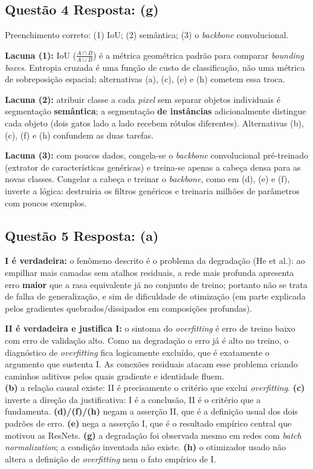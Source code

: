 \documentclass[11pt,a4paper]{article}
\begin{document}
\subsection*{Questão 4 \textemdash{} Resposta: (g)}
Preenchimento correto: (1) IoU; (2) semântica; (3) o \textit{backbone} convolucional.

\textbf{Lacuna (1):} IoU ($\frac{A \cap B}{A \cup B}$) é a métrica geométrica padrão para comparar \textit{bounding boxes}. Entropia cruzada é uma função de custo de classificação, não uma métrica de sobreposição espacial; alternativas (a), (c), (e) e (h) cometem essa troca.

\textbf{Lacuna (2):} atribuir classe a cada \textit{pixel} sem separar objetos individuais é segmentação \textbf{semântica}; a segmentação \textbf{de instâncias} adicionalmente distingue cada objeto (dois gatos lado a lado recebem rótulos diferentes). Alternativas (b), (c), (f) e (h) confundem as duas tarefas.

\textbf{Lacuna (3):} com poucos dados, congela-se o \textit{backbone} convolucional pré-treinado (extrator de características genéricas) e treina-se apenas a cabeça densa para as novas classes. Congelar a cabeça e treinar o \textit{backbone}, como em (d), (e) e (f), inverte a lógica: destruiria os filtros genéricos e treinaria milhões de parâmetros com poucos exemplos.

\subsection*{Questão 5 \textemdash{} Resposta: (a)}
\textbf{I é verdadeira:} o fenômeno descrito é o problema da degradação (He et al.): ao empilhar mais camadas sem atalhos residuais, a rede mais profunda apresenta erro \textbf{maior} que a rasa equivalente já no conjunto de treino; portanto não se trata de falha de generalização, e sim de dificuldade de otimização (em parte explicada pelos gradientes quebrados/dissipados em composições profundas).

\textbf{II é verdadeira e justifica I:} o sintoma do \textit{overfitting} é erro de treino baixo com erro de validação alto. Como na degradação o erro já é alto no treino, o diagnóstico de \textit{overfitting} fica logicamente excluído, que é exatamente o argumento que sustenta I. As conexões residuais atacam esse problema criando caminhos aditivos pelos quais gradiente e identidade fluem.\\
\textbf{(b)} a relação causal existe: II é precisamente o critério que exclui \textit{overfitting}.
\textbf{(c)} inverte a direção da justificativa: I é a conclusão, II é o critério que a fundamenta.
\textbf{(d)/(f)/(h)} negam a asserção II, que é a definição usual dos dois padrões de erro.
\textbf{(e)} nega a asserção I, que é o resultado empírico central que motivou as ResNets.
\textbf{(g)} a degradação foi observada mesmo em redes com \textit{batch normalization}; a condição inventada não existe.
\textbf{(h)} o otimizador usado não altera a definição de \textit{overfitting} nem o fato empírico de I.
\end{document}
